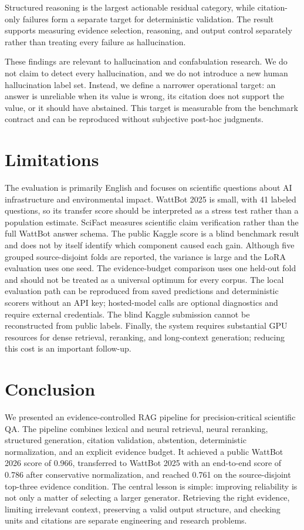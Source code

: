 \documentclass[11pt]{article}
\begin{document}
Structured reasoning is the largest actionable residual category, while citation-only failures form a separate target for deterministic validation. The result supports measuring evidence selection, reasoning, and output control separately rather than treating every failure as hallucination.

These findings are relevant to hallucination and confabulation research. We do not claim to detect every hallucination, and we do not introduce a new human hallucination label set. Instead, we define a narrower operational target: an answer is unreliable when its value is wrong, its citation does not support the value, or it should have abstained. This target is measurable from the benchmark contract and can be reproduced without subjective post-hoc judgments.

\section{Limitations}
\label{sec:limitations}
The evaluation is primarily English and focuses on scientific questions about AI infrastructure and environmental impact. WattBot 2025 is small, with 41 labeled questions, so its transfer score should be interpreted as a stress test rather than a population estimate. SciFact measures scientific claim verification rather than the full WattBot answer schema. The public Kaggle score is a blind benchmark result and does not by itself identify which component caused each gain. Although five grouped source-disjoint folds are reported, the variance is large and the LoRA evaluation uses one seed. The evidence-budget comparison uses one held-out fold and should not be treated as a universal optimum for every corpus. The local evaluation path can be reproduced from saved predictions and deterministic scorers without an API key; hosted-model calls are optional diagnostics and require external credentials. The blind Kaggle submission cannot be reconstructed from public labels. Finally, the system requires substantial GPU resources for dense retrieval, reranking, and long-context generation; reducing this cost is an important follow-up.

\section{Conclusion}
\label{sec:conclusion}
We presented an evidence-controlled RAG pipeline for precision-critical scientific QA. The pipeline combines lexical and neural retrieval, neural reranking, structured generation, citation validation, abstention, deterministic normalization, and an explicit evidence budget. It achieved a public WattBot 2026 score of 0.966, transferred to WattBot 2025 with an end-to-end score of 0.786 after conservative normalization, and reached 0.761 on the source-disjoint top-three evidence condition. The central lesson is simple: improving reliability is not only a matter of selecting a larger generator. Retrieving the right evidence, limiting irrelevant context, preserving a valid output structure, and checking units and citations are separate engineering and research problems.
\end{document}
